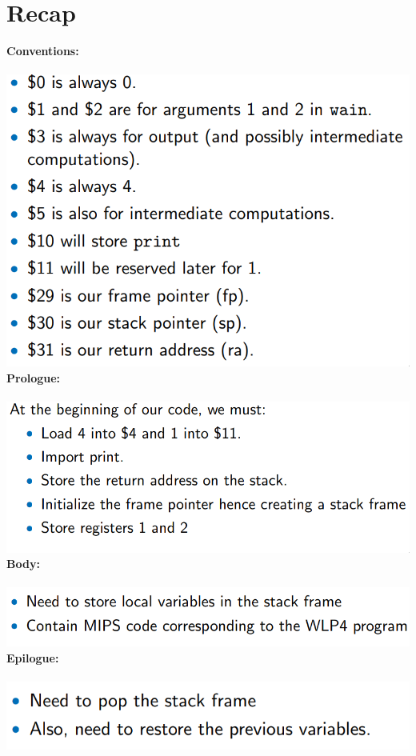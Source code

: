 \documentclass[12pt]{article}
\begin{document}
\section{Recap}
\textbf{Conventions:}\\\\
\includegraphics[scale=0.3]{conventions.png}\\
\textbf{Prologue:}\\\\
\includegraphics[scale=0.3]{prologue.png}\\
\textbf{Body:}\\\\
\includegraphics[scale=0.3]{body.png}\\
\textbf{Epilogue:}\\\\
\includegraphics[scale=0.3]{epilogue.png}\\
\end{document}
